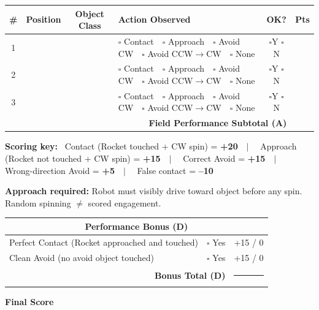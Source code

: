 \documentclass[a4]{article}
\begin{document}
{\small
\begin{tabular}{|c|c|c|l|c|c|}
\hline
\textbf{\#} & \textbf{Position} & \textbf{Object Class} & \textbf{Action Observed} & \textbf{OK?} & \textbf{Pts} \\
\hline
1 & & & $\square$ Contact~~$\square$ Approach~~$\square$ Avoid CW~~$\square$ Avoid CCW$\to$CW~~$\square$ None & $\square$Y $\square$N & \\[2pt]
\hline
2 & & & $\square$ Contact~~$\square$ Approach~~$\square$ Avoid CW~~$\square$ Avoid CCW$\to$CW~~$\square$ None & $\square$Y $\square$N & \\[2pt]
\hline
3 & & & $\square$ Contact~~$\square$ Approach~~$\square$ Avoid CW~~$\square$ Avoid CCW$\to$CW~~$\square$ None & $\square$Y $\square$N & \\[2pt]
\hline
\multicolumn{5}{|r|}{\textbf{Field Performance Subtotal (A)}} & \\
\hline
\end{tabular}
}

\vspace{0.3em}

{\scriptsize
\textbf{Scoring key:}~
Contact (Rocket touched + CW spin) = \textbf{+20}~~$\vert$~~
Approach (Rocket not touched + CW spin) = \textbf{+15}~~$\vert$~~
Correct Avoid = \textbf{+15}~~$\vert$~~
Wrong-direction Avoid = \textbf{+5}~~$\vert$~~
False contact = \textbf{--10}
}

\vspace{0.3em}

{\scriptsize
\textbf{Approach required:} Robot must visibly drive toward object before any spin. Random spinning $\neq$ scored engagement.
}

\vspace{0.5em}

{\small
\begin{tabular}{|p{7cm}|c|c|}
\hline
\multicolumn{3}{|c|}{\textbf{Performance Bonus (D)}} \\
\hline
Perfect Contact (Rocket approached and touched) & $\square$ Yes & +15 / 0 \\
\hline
Clean Avoid (no avoid object touched) & $\square$ Yes & +15 / 0 \\
\hline
\multicolumn{2}{|r|}{\textbf{Bonus Total (D)}} & \rule{1.2cm}{0.4pt} \\
\hline
\end{tabular}
}

\vspace{0.5em}

{\small \textbf{Final Score}}
\end{document}
